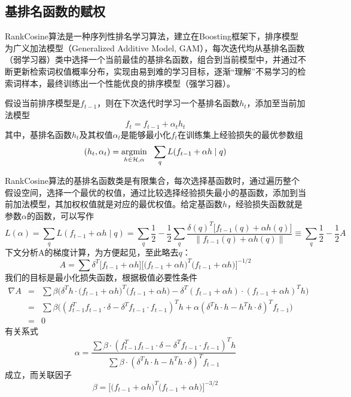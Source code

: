 \subsection{基排名函数的赋权}
RankCosine算法\cite{qin2008query}是一种序列性排名学习算法，建立在Boosting框架下，排序模型为广义加法模型（Generalized Additive Model, GAM），每次迭代均从基排名函数（弱学习器）类中选择一个当前最佳的基排名函数，组合到当前模型中，并通过不断更新检索词权值概率分布，实现由易到难的学习目标，逐渐“理解”不易学习的检索词样本，最终训练出一个性能优良的排序模型（强学习器）。

假设当前排序模型是$f_{t-1}$，则在下次迭代时学习一个基排名函数$h_t$，添加至当前加法模型
\begin{equation}
    f_t = f_{t-1} + \alpha_t h_t
\end{equation}
其中，基排名函数$h_t$及其权值$\alpha_t$是能够最小化$f_t$在训练集上经验损失的最优参数组
\begin{equation}
    (h_t,\alpha_t) = \operatorname*{\mathrm{\arg\!\min}}\limits_{h\in \mathcal{H}, \alpha}~~\sum\limits_q L(f_{t-1} + \alpha h \mid q)
\end{equation}

RankCosine算法的基排名函数类是有限集合，每次选择基函数时，通过遍历整个假设空间，选择一个最优的权值，通过比较选择经验损失最小的基函数，添加到当前加法模型，其加权权值就是对应的最优权值。给定基函数$h$，经验损失函数就是参数$\alpha$的函数，可以写作
\begin{equation}
    L(\alpha) = \sum\limits_q L(f_{t-1} + \alpha h \mid q) = \sum\limits_q \frac{1}{2} - \frac{1}{2} \sum\limits_q \frac{\delta(q)^T \big[f_{t-1}(q) + \alpha h(q)\big]}{\|f_{t-1}(q) + \alpha h(q)\|} \equiv \sum\limits_q \frac{1}{2} - \frac{1}{2} A
\end{equation}
下文分析A的梯度计算，为方便起见，至此略去$q$：
\begin{equation}
    A = \sum \delta^T \big[f_{t-1} + \alpha h\big] \big[\big(f_{t-1} + \alpha h\big)^T \big(f_{t-1} + \alpha h\big)\big]^{-1/2}
\end{equation}
我们的目标是最小化损失函数，根据极值必要性条件
\begin{equation}
    \begin{array}{lll}
      \nabla A & = & \sum \beta \Big(\delta^T h \cdot \big(f_{t-1} + \alpha h\big)^T \big(f_{t-1} + \alpha h\big) - \delta^T (f_{t-1} + \alpha h) \cdot (f_{t-1} + \alpha h)^T h\Big) \\
       & = & \sum \beta \Big((f_{t-1}^T f_{t-1} \cdot \delta - \delta^T f_{t-1}\cdot f_{t-1})^T h + \alpha (\delta^T h \cdot h - h^T h \cdot \delta)^T f_{t-1}\Big)\\
       & = & 0
    \end{array}
\end{equation}
有关系式
\begin{equation}
    \alpha = \frac{\sum \beta \cdot (f_{t-1}^T f_{t-1} \cdot \delta - \delta^T f_{t-1}\cdot f_{t-1})^T h}{\sum \beta \cdot (\delta^T h \cdot h - h^T h \cdot \delta)^T f_{t-1}}
\end{equation}
成立，而关联因子
\begin{equation}
    \beta=\big[\big(f_{t-1} + \alpha h\big)^T \big(f_{t-1} + \alpha h\big)\big]^{-3/2}
\end{equation}


